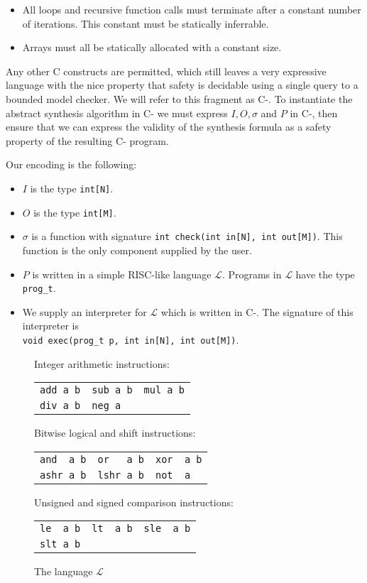 \documentclass[a4paper]{llncs}
\begin{document}
\begin{itemize}
 \item All loops and recursive function calls must terminate after a constant number
 of iterations.  This constant must be statically inferrable.
 \item Arrays must all be statically allocated with a constant size.
\end{itemize}

Any other C constructs are permitted, which still leaves a very expressive
language with the nice property that safety is decidable using a single query to a
bounded model checker.  We will refer to this fragment as C-.  To instantiate the
abstract synthesis algorithm in C- we must express $I, O, \sigma$ and $P$ in C-,
then ensure that we can express the validity of the synthesis formula as a safety
property of the resulting C- program.

Our encoding is the following:
%
\begin{itemize}
 \item $I$ is the type \verb|int[N]|.
 \item $O$ is the type \verb|int[M]|.
 \item $\sigma$ is a function with signature
 \verb|int check(int in[N], int out[M])|. This function is the only component supplied
 by the user.
 \item $P$ is written in a simple RISC-like language $\mathcal{L}$.  Programs in $\mathcal{L}$
 have the type \verb|prog_t|.
 \item We supply an interpreter for $\mathcal{L}$ which is written in C-.  The signature
 of this interpreter is \\
 \verb|void exec(prog_t p, int in[N], int out[M])|.
\end{itemize}

\begin{figure}
\centering
\begin{minipage}{0.65\textwidth}
\setlength{\tabcolsep}{16pt}
Integer arithmetic instructions:

\begin{tabular}{lll}
 \verb|add a b| & \verb|sub a b| & \verb|mul a b| \\
 \verb|div a b| & \verb|neg a|
\end{tabular}
\bigskip

Bitwise logical and shift instructions:

\begin{tabular}{lll}
 \verb|and  a b| & \verb|or   a b| & \verb|xor  a b| \\
 \verb|ashr a b| & \verb|lshr a b| & \verb|not  a|
\end{tabular}
\bigskip

Unsigned and signed comparison instructions:

\begin{tabular}{lll}
 \verb|le  a b| & \verb|lt  a b| & \verb|sle  a b| \\
 \verb|slt a b|
\end{tabular}
\end{minipage}

 \label{fig:l-language}
 \caption{The language $\mathcal{L}$}
\end{figure}
\end{document}
